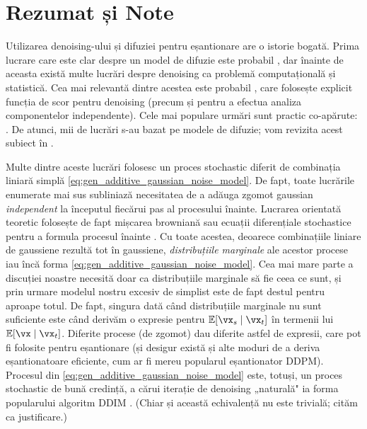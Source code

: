 \documentclass[../../book-main_ro.tex]{subfiles}
\begin{document}
\section{Rezumat și Note}

Utilizarea denoising-ului și difuziei pentru eșantionare are o istorie bogată. Prima lucrare care este clar despre un model de difuzie este probabil \cite{Sohl-Dickstein2015}, dar înainte de aceasta există multe lucrări despre denoising ca problemă computațională și statistică. Cea mai relevantă dintre acestea este probabil \cite{hyvarinen05a}, care folosește explicit funcția de scor pentru denoising (precum și pentru a efectua analiza componentelor independente). Cele mai populare urmări sunt practic co-apărute: \cite{ho2020denoising,song2019}. De atunci, mii de lucrări s-au bazat pe modele de difuzie; vom revizita acest subiect în .

Multe dintre aceste lucrări folosesc un proces stochastic diferit de combinația liniară simplă \eqref{eq:gen_additive_gaussian_noise_model}. De fapt, toate lucrările enumerate mai sus subliniază necesitatea de a adăuga zgomot gaussian \textit{independent} la începutul fiecărui pas al procesului înainte. Lucrarea orientată teoretic folosește de fapt mișcarea browniană sau ecuații diferențiale stochastice pentru a formula procesul înainte \cite{song2020score}. Cu toate acestea, deoarece combinațiile liniare de gaussiene rezultă tot în gaussiene, \textit{distribuțiile marginale} ale acestor procese iau încă forma \eqref{eq:gen_additive_gaussian_noise_model}. Cea mai mare parte a discuției noastre necesită doar ca distribuțiile marginale să fie ceea ce sunt, și prin urmare modelul nostru excesiv de simplist este de fapt destul pentru aproape totul. De fapt, singura dată când distribuțiile marginale nu sunt suficiente este când derivăm o expresie pentru \(\Ex[\vx_{s} \mid \vx_{t}]\) în termenii lui \(\Ex[\vx \mid \vx_{t}]\). Diferite procese (de zgomot) dau diferite astfel de expresii, care pot fi folosite pentru eșantionare (și desigur există și alte moduri de a deriva eșantionatoare eficiente, cum ar fi mereu popularul eșantionator DDPM). Procesul din \eqref{eq:gen_additive_gaussian_noise_model} este, totuși, un proces stochastic de bună credință, a cărui iterație de denoising „naturală" ia forma popularului algoritm DDIM \cite{song2020denoising}. (Chiar și această echivalență nu este trivială; cităm \cite{de2025distributional} ca justificare.)
\end{document}
